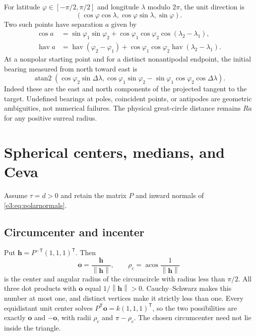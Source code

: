 \documentclass[11pt,letterpaper]{article}
\numberwithin{equation}{section}
\theoremstyle{definition}
\theoremstyle{remark}
\newcommand{\atantwo}{\operatorname{atan2}}
\newcommand{\acos}{\operatorname{acos}}
\newcommand{\hav}{\operatorname{hav}}
\newcommand{\norm}[1]{\left\lVert#1\right\rVert}
\newcommand{\vv}[1]{\bm{#1}}
\newcommand{\transpose}{^{\mathsf T}}
\begin{document}
For latitude $\varphi\in[-\pi/2,\pi/2]$ and longitude $\lambda$ modulo
$2\pi$, the unit direction is
\[
 (\cos\varphi\cos\lambda,\cos\varphi\sin\lambda,\sin\varphi).
\]
Two such points have separation $a$ given by
\begin{align}
 \cos a&=\sin\varphi_1\sin\varphi_2+
          \cos\varphi_1\cos\varphi_2\cos(\lambda_2-\lambda_1),\label{e3:eq:latcos}\\
 \hav a&=\hav(\varphi_2-\varphi_1)+
          \cos\varphi_1\cos\varphi_2\hav(\lambda_2-\lambda_1).\label{e3:eq:lathav}
\end{align}
At a nonpolar starting point and for a distinct nonantipodal endpoint, the
initial bearing measured from north toward east is
\begin{equation}\label{e3:eq:bearing}
 \atantwo\left(
 \cos\varphi_2\sin\Delta\lambda,
 \cos\varphi_1\sin\varphi_2-
 \sin\varphi_1\cos\varphi_2\cos\Delta\lambda\right).
\end{equation}
Indeed these are the east and north components of the projected tangent to
the target. Undefined bearings at poles, coincident points, or antipodes are
geometric ambiguities, not numerical failures. The physical great-circle
distance remains $Ra$ for any positive surreal radius.

\section{Spherical centers, medians, and Ceva}\label{e3:sec:centers}

Assume $\tau=d>0$ and retain the matrix $P$ and inward normals of
\cref{e3:eq:polarnormals}.

\subsection{Circumcenter and incenter}

Put $\vv h=P^{-\mathsf T}(1,1,1)\transpose$. Then
\begin{equation}\label{e3:eq:circumcenter}
 \vv o=\frac{\vv h}{\norm{\vv h}},\qquad
 \rho_c=\acos\frac1{\norm{\vv h}}
\end{equation}
is the center and angular radius of the circumcircle with radius less than
$\pi/2$. All three dot products with $\vv o$ equal
$1/\norm{\vv h}>0$. Cauchy--Schwarz makes this number at most one, and
distinct vertices make it strictly less than one. Every equidistant unit
center solves $P\transpose\vv o=k(1,1,1)\transpose$, so the two possibilities
are exactly $\vv o$ and $-\vv o$, with radii $\rho_c$ and $\pi-\rho_c$.
The chosen circumcenter need not lie inside the triangle.
\end{document}
